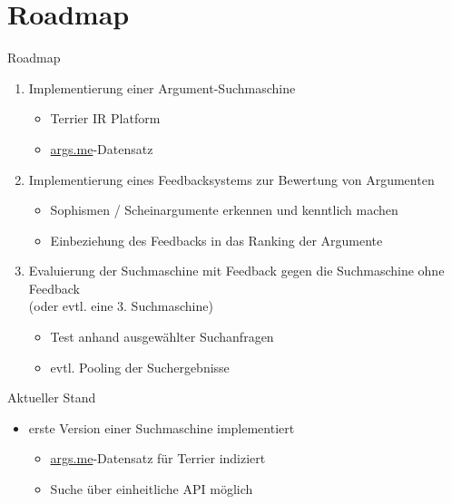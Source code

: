 \documentclass{beamer}
\begin{document}
	\section{Roadmap}
	\begin{frame}{Roadmap}
		\begin{enumerate}
			\item Implementierung einer Argument-Suchmaschine
			\begin{itemize}
				\item Terrier IR Platform
				\item \url{args.me}-Datensatz
			\end{itemize}
			\item Implementierung eines Feedbacksystems zur Bewertung von Argumenten
			\begin{itemize}
				\item Sophismen / Scheinargumente erkennen und kenntlich machen
				\item Einbeziehung des Feedbacks in das Ranking der Argumente
			\end{itemize}
			\item Evaluierung der Suchmaschine mit Feedback gegen die Suchmaschine ohne Feedback\\(oder evtl. eine 3. Suchmaschine)
			\begin{itemize}
				\item Test anhand ausgewählter Suchanfragen
				\item evtl. Pooling der Suchergebnisse
			\end{itemize}
		\end{enumerate}
	\end{frame}
	\begin{frame}{Aktueller Stand}
		\begin{itemize}
			\item erste Version einer Suchmaschine implementiert
			\begin{itemize}
				\item \url{args.me}-Datensatz für Terrier indiziert
				\item Suche über einheitliche API möglich
			\end{itemize}
		\end{itemize}
	\end{frame}
\end{document}
